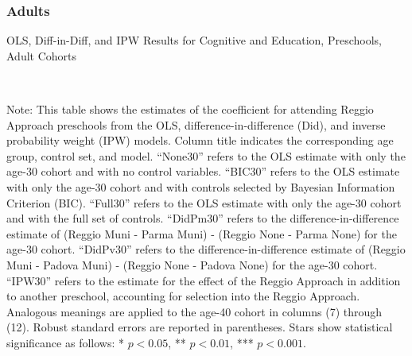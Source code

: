 \subsubsection{Adults}
\begin{landscape}

\begin{table}[H] \caption{OLS, Diff-in-Diff, and IPW Results for Cognitive and Education, Preschools, Adult Cohorts} \label{ols-E-reg}
\scalebox{0.80}{}
\vspace{1ex} \\
\footnotesize\raggedright{Note: This table shows the estimates of the coefficient for attending Reggio Approach preschools from the OLS, difference-in-difference (Did), and inverse probability weight (IPW) models. Column title indicates the corresponding age group, control set, and model. ``None30'' refers to the OLS estimate with only the age-30 cohort and with no control variables. ``BIC30'' refers to the OLS estimate with only the age-30 cohort and with controls selected by Bayesian Information Criterion (BIC). ``Full30'' refers to the OLS estimate with only the age-30 cohort and with the full set of controls. ``DidPm30'' refers to the difference-in-difference estimate of (Reggio Muni - Parma Muni) - (Reggio None - Parma None) for the age-30 cohort. ``DidPv30'' refers to the difference-in-difference estimate of (Reggio Muni - Padova Muni) - (Reggio None - Padova None) for the age-30 cohort. ``IPW30'' refers to the estimate for the effect of the Reggio Approach in addition to another preschool, accounting for selection into the Reggio Approach. Analogous meanings are applied to the age-40 cohort in columns (7) through (12). Robust standard errors are reported in parentheses. Stars show statistical significance as follows: * $p < 0.05$, ** $p < 0.01$, *** $p < 0.001$.}
\end{table}



\end{landscape}
